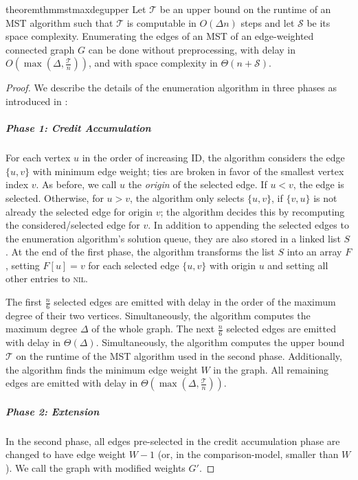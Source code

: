 \documentclass[a4paper, USenglish, cleveref, autoref, thm-restate]{lipics-v2021}
\newcommand{\maxdeg}{\Delta}
\newcommand{\totaltime}{\mathcal{T}}
\newcommand{\totalspace}{\mathcal{S}}
\begin{document}
\begin{restatable}{theorem}{thmmstmaxdegupper}
	\label{thm:mst-maxdeg-upper}
	Let $\totaltime$ be an upper bound on the runtime of an MST algorithm such that $\totaltime$ is computable in $O(\maxdeg n)$ steps and let $\totalspace$ be its space complexity.
	Enumerating the edges of an MST of an edge-weighted connected graph $G$ can be done without preprocessing, with delay in $O(\max(\maxdeg, \frac{\totaltime}{n}))$, and with space complexity in $\Theta(n + \totalspace)$.
\end{restatable}
\begin{proof}
	We describe the details of the enumeration algorithm in three phases as introduced in :
	
	\subparagraph*{Phase 1: Credit Accumulation}
	For each vertex $u$ in the order of increasing ID, the algorithm considers the edge $\{u,v\}$ with minimum edge weight; ties are broken in favor of the smallest vertex index $v$.
	As before, we call $u$ the \textit{origin} of the selected edge.
	If $u < v$, the edge is selected.
	Otherwise, for $u > v$, the algorithm only selects $\{u,v\}$, if $\{v,u\}$ is not already the selected edge for origin $v$; the algorithm decides this by recomputing the considered/selected edge for $v$.
	In addition to appending the selected edges to the enumeration algorithm's solution queue, they are also stored in a linked list $S$.
	At the end of the first phase, the algorithm transforms the list $S$ into an array $F$, setting $F[u] = v$ for each selected edge $\{u,v\}$ with origin $u$ and setting all other entries to \textsc{nil}.
	
	The first $\frac{n}{6}$ selected edges are emitted with delay in the order of the maximum degree of their two vertices.
	Simultaneously, the algorithm computes the maximum degree $\maxdeg$ of the whole graph.
	The next $\frac{n}{6}$ selected edges are emitted with delay in $\Theta(\maxdeg)$.
	Simultaneously, the algorithm computes the upper bound $\totaltime$ on the runtime of the MST algorithm used in the second phase.
	Additionally, the algorithm finds the minimum edge weight $W$ in the graph.
	All remaining edges are emitted with delay in $\Theta(\max(\maxdeg, \frac{\totaltime}{n}))$.
	
	\subparagraph*{Phase 2: Extension}
	In the second phase, all edges pre-selected in the credit accumulation phase are changed to have edge weight $W - 1$ (or, in the comparison-model, smaller than $W$).
	We call the graph with modified weights $G'$.
	

\end{proof}
\end{document}
